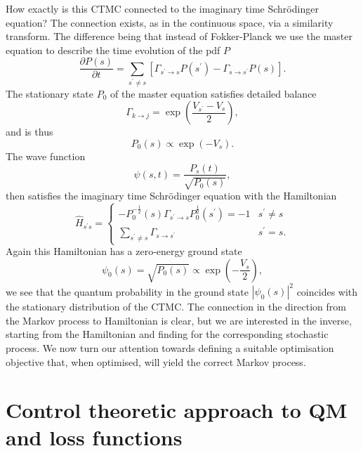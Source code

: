 How exactly is this CTMC connected to the imaginary time Schr\" odinger equation? The connection exists, as in the continuous space, via a similarity transform. The difference being that instead of Fokker-Planck we use the master equation to describe the time evolution of the pdf $P$
\begin{equation}
\frac{\partial P(s)}{\partial t}=\sum_{s^\prime \neq s}\left[\Gamma_{s^\prime \rightarrow s} P(s^\prime)-\Gamma_{s \rightarrow s^\prime} P(s)\right].
\end{equation}
The stationary state $P_0$ of the master equation satisfies detailed balance
\begin{equation}
	\Gamma_{k \rightarrow j}=\exp \left(\frac{V_{s^\prime}-V_{s}}{2}\right),
\end{equation}
and is thus
\begin{equation}
	P_{0}(s) \propto \exp \left(-V_{s}\right).
\end{equation}
The wave function 
\begin{equation}
	\psi(s, t)=\frac{P_{s}(t)}{\sqrt{P_{0}(s)}},
\end{equation}
then satisfies the imaginary time Schr\" odinger equation with the Hamiltonian
\begin{equation}
	\hat H_{s^\prime s}=\left\{\begin{array}{ll}
	-P_{0}^{-\frac{1}{2}}(s) \Gamma_{s^\prime \rightarrow s} P_{0}^{\frac{1}{2}}(s^\prime)=-1 & s^\prime \neq s \\
	\sum_{s^\prime \neq s} \Gamma_{s \rightarrow s^\prime} & s^\prime=s.
	\end{array}\right. 
\end{equation}
Again this Hamiltonian has a zero-energy ground state 
\begin{equation}
	\psi_{0}(s)=\sqrt{P_{0}(s)} \propto \exp \left(-\frac{V_{s}}{2}\right),
\end{equation}
we see that the quantum probability in the ground state $|\psi_0(s)|^2$ coincides with the stationary distribution of the CTMC. The connection in the direction from the Markov process to Hamiltonian is clear, but we are interested in the inverse, starting from the Hamiltonian and finding for the corresponding stochastic process. We now turn our attention towards defining a suitable optimisation objective that, when optimised, will yield the correct Markov process.

\section{Control theoretic approach to QM and loss functions}
